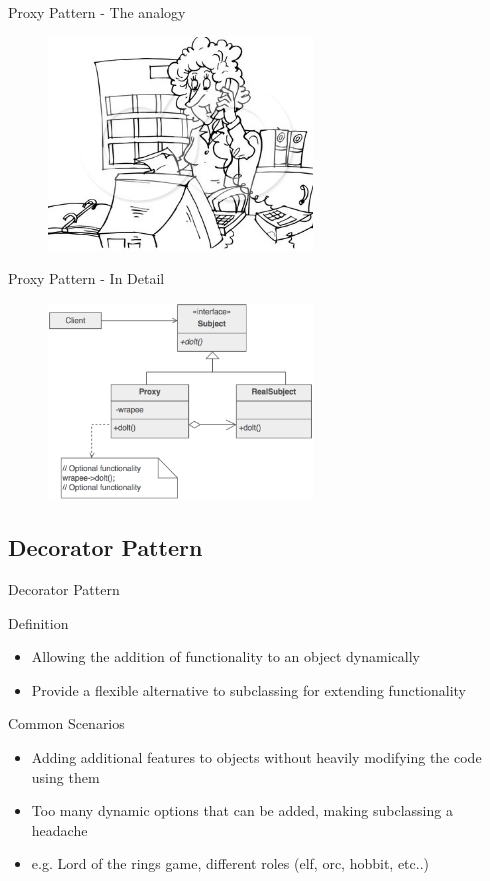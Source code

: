\documentclass{beamer}
\begin{document}
\begin{frame}{Proxy Pattern - The analogy}
 \begin{figure}[htp]
    \centering
    \includegraphics[width=7cm]{pics/secretary}
    \label{fig:proxy}
    \end{figure}
\end{frame}

\begin{frame}{Proxy Pattern - In Detail}
    \begin{figure}[htp]
    \centering
    \includegraphics[width=7cm]{pics/proxy2}
    \label{fig:proxy2}
    \end{figure}
\end{frame}


\subsection{Decorator Pattern}
\begin{frame}{Decorator Pattern}
  \begin{block}{Definition}
   \begin{itemize}
    \item {Allowing the addition of functionality to an object dynamically}
    \item {Provide a flexible alternative to subclassing for extending functionality}
   \end{itemize}
  \end{block}
  \pause
  \begin{block}{Common Scenarios}
   \begin{itemize}
    \item { Adding additional features to objects without heavily modifying the code using them}
    \item { Too many dynamic options that can be added, making subclassing a headache }
    \item { e.g. Lord of the rings game, different roles (elf, orc, hobbit, etc..) }
   \end{itemize}
  \end{block}
\end{frame}
\end{document}
